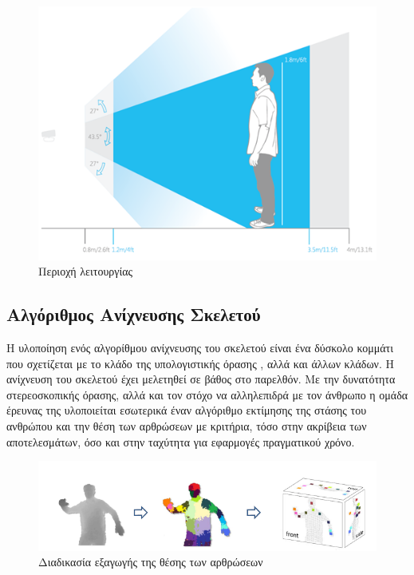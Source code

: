 \begin{figure}[H]
    \centering
    \includegraphics[width=.8\textwidth, height=.35\textheight]{kinect/fig/kinect-operation-mode.png}
    \caption{Περιοχή λειτουργίας\protect\footnotemark}
    \label{fig:kinect-operation-mode}
\end{figure}

\subsection{Αλγόριθμος Ανίχνευσης Σκελετού}

Η υλοποίηση ενός αλγορίθμου ανίχνευσης του σκελετού είναι ένα δύσκολο κομμάτι που σχετίζεται με το κλάδο της υπολογιστικής όρασης \cite{mubarak97}, αλλά και άλλων κλάδων. Η ανίχνευση του σκελετού έχει μελετηθεί σε βάθος \cite{thomas00, poppe07} στο παρελθόν. Με την δυνατότητα στερεοσκοπικής όρασης, αλλά και τον στόχο να αλληλεπιδρά με τον άνθρωπο η ομάδα έρευνας της  υλοποιείται εσωτερικά έναν αλγόριθμο εκτίμησης της στάσης του ανθρώπου και την θέση των αρθρώσεων \cite{shotton11} με κριτήρια, τόσο στην ακρίβεια των αποτελεσμάτων, όσο και στην ταχύτητα για εφαρμογές πραγματικού χρόνο.

\begin{figure}[H]
    \centering
    \includegraphics[width=.9\textwidth]{kinect/fig/kinect-skeleton-algorithm.png}
    \caption{Διαδικασία εξαγωγής της θέσης των αρθρώσεων\protect\footnotemark}
    \label{fig:kinect-skeleton-algorithm}
\end{figure}

